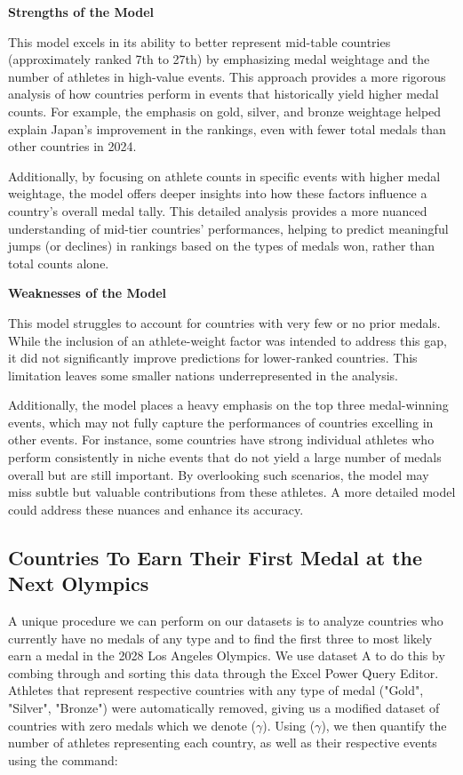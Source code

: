 \documentclass{mcmthesis}
\begin{document}
\textbf{Strengths of the Model} 

\par This model excels in its ability to better represent mid-table countries (approximately ranked 7th to 27th) by emphasizing medal weightage and the number of athletes in high-value events. This approach provides a more rigorous analysis of how countries perform in events that historically yield higher medal counts. For example, the emphasis on gold, silver, and bronze weightage helped explain Japan's improvement in the rankings, even with fewer total medals than other countries in 2024. 

Additionally, by focusing on athlete counts in specific events with higher medal weightage, the model offers deeper insights into how these factors influence a country's overall medal tally. This detailed analysis provides a more nuanced understanding of mid-tier countries' performances, helping to predict meaningful jumps (or declines) in rankings based on the types of medals won, rather than total counts alone. 

\textbf{Weaknesses of the Model}

This model struggles to account for countries with very few or no prior medals. While the inclusion of an athlete-weight factor was intended to address this gap, it did not significantly improve predictions for lower-ranked countries. This limitation leaves some smaller nations underrepresented in the analysis. 

Additionally, the model places a heavy emphasis on the top three medal-winning events, which may not fully capture the performances of countries excelling in other events. For instance, some countries have strong individual athletes who perform consistently in niche events that do not yield a large number of medals overall but are still important. By overlooking such scenarios, the model may miss subtle but valuable contributions from these athletes. A more detailed model could address these nuances and enhance its accuracy.


\subsection{Countries To Earn Their First Medal at the Next Olympics}
A unique procedure we can perform on our datasets is to analyze countries who currently have no medals of any type and to find the first three to most likely earn a medal in the 2028 Los Angeles Olympics. We use dataset A to do this by combing through and sorting this data through the Excel Power Query Editor. Athletes that represent respective countries with any type of medal ("Gold", "Silver", "Bronze") were automatically removed, giving us a modified dataset of countries with zero medals which we denote ($\gamma$). Using ($\gamma$), we then quantify the number of athletes representing each country, as well as their respective events using the command: 
\end{document}
